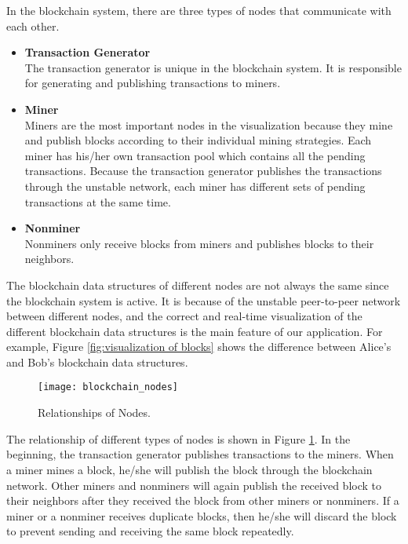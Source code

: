 In the blockchain system, there are three types of nodes that communicate with each other. 
\begin{itemize}
    \item \textbf{Transaction Generator} \\
        The transaction generator is unique in the blockchain system. It is responsible for generating and publishing transactions to miners.
    \item \textbf{Miner} \\
        Miners are the most important nodes in the visualization because they mine and publish blocks according to their individual mining strategies. Each miner has his/her own transaction pool which contains all the pending transactions. Because the transaction generator publishes the transactions through the unstable network, each miner has different sets of pending transactions at the same time.
    \item \textbf{Nonminer} \\
        Nonminers only receive blocks from miners and publishes blocks to their neighbors.
\end{itemize}

The blockchain data structures of different nodes are not always the same since the blockchain system is active. It is because of the unstable peer-to-peer network between different nodes, and the correct and real-time visualization of the different blockchain data structures is the main feature of our application. For example, Figure \ref{fig:visualization of blocks} shows the difference between Alice's and Bob's blockchain data structures.

\begin{figure}[htb]
    \centering
    \texttt{[image: blockchain\_nodes]}
    \caption{Relationships of Nodes.}
    \label{fig:relationship of nodes}
\end{figure}

The relationship of different types of nodes is shown in Figure \ref{fig:relationship of nodes}. In the beginning, the transaction generator publishes transactions to the miners. When a miner mines a block, he/she will publish the block through the blockchain network. Other miners and nonminers will again publish the received block to their neighbors after they received the block from other miners or nonminers. If a miner or a nonminer receives duplicate blocks, then he/she will discard the block to prevent sending and receiving the same block repeatedly.

